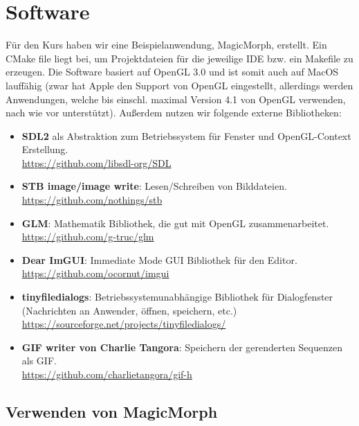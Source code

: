 \chapter{Software}

Für den Kurs haben wir eine Beispielanwendung, MagicMorph, erstellt.
Ein CMake file liegt bei, um Projektdateien für die jeweilige IDE
bzw. ein Makefile zu erzeugen. Die Software basiert
auf OpenGL 3.0 und ist somit auch auf MacOS lauffähig (zwar hat Apple
den Support von OpenGL eingestellt, allerdings werden Anwendungen, welche bis
einschl. maximal Version 4.1 von OpenGL verwenden, nach wie vor unterstützt).
Au\ss erdem nutzen wir folgende externe Bibliotheken:

\begin{itemize}
	\item \textbf{SDL2} als Abstraktion zum Betriebssystem für Fenster und OpenGL-Context Erstellung.
	\\\href{https://github.com/libsdl-org/SDL}{https://github.com/libsdl-org/SDL} 
	\item \textbf{STB image/image write}: Lesen/Schreiben von Bilddateien.
		\\\href{https://github.com/nothings/stb}{https://github.com/nothings/stb} 
	\item \textbf{GLM}: Mathematik Bibliothek, die gut mit OpenGL zusammenarbeitet. 
			\\\href{https://github.com/g-truc/glm}{https://github.com/g-truc/glm}
	\item \textbf{Dear ImGUI}: Immediate Mode GUI Bibliothek für den Editor. 
	\\\href{https://github.com/ocornut/imgui}{https://github.com/ocornut/imgui}
	\item \textbf{tinyfiledialogs}: Betriebssystemunabhängige Bibliothek für Dialogfenster (Nachrichten an Anwender, öffnen, speichern, etc.)	\\\href{https://sourceforge.net/projects/tinyfiledialogs/}{https://sourceforge.net/projects/tinyfiledialogs/}
	\item \textbf{GIF writer von Charlie Tangora}: Speichern der gerenderten Sequenzen als GIF.
				\\\href{https://github.com/charlietangora/gif-h}{https://github.com/charlietangora/gif-h} 
\end{itemize}

\section{Verwenden von MagicMorph}

